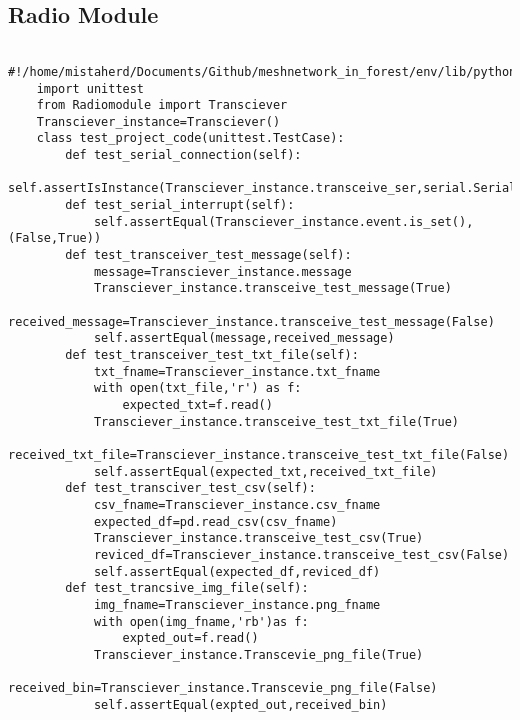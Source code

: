 \subsection{Radio Module}
\begin{lstlisting}
    #!/home/mistaherd/Documents/Github/meshnetwork_in_forest/env/lib/python3.11
    import unittest
    from Radiomodule import Transciever
    Transciever_instance=Transciever()
    class test_project_code(unittest.TestCase):
        def test_serial_connection(self):
            self.assertIsInstance(Transciever_instance.transceive_ser,serial.Serial)
        def test_serial_interrupt(self):
            self.assertEqual(Transciever_instance.event.is_set(),(False,True))
        def test_transceiver_test_message(self):
            message=Transciever_instance.message
            Transciever_instance.transceive_test_message(True)
            received_message=Transciever_instance.transceive_test_message(False)
            self.assertEqual(message,received_message)
        def test_transceiver_test_txt_file(self):
            txt_fname=Transciever_instance.txt_fname
            with open(txt_file,'r') as f:
                expected_txt=f.read()
            Transciever_instance.transceive_test_txt_file(True)
            received_txt_file=Transciever_instance.transceive_test_txt_file(False)
            self.assertEqual(expected_txt,received_txt_file)
        def test_transciver_test_csv(self):
            csv_fname=Transciever_instance.csv_fname
            expected_df=pd.read_csv(csv_fname)
            Transciever_instance.transceive_test_csv(True)
            reviced_df=Transciever_instance.transceive_test_csv(False)
            self.assertEqual(expected_df,reviced_df)
        def test_trancsive_img_file(self):
            img_fname=Transciever_instance.png_fname
            with open(img_fname,'rb')as f:
                expted_out=f.read()
            Transciever_instance.Transcevie_png_file(True)
            received_bin=Transciever_instance.Transcevie_png_file(False)
            self.assertEqual(expted_out,received_bin)
\end{lstlisting}